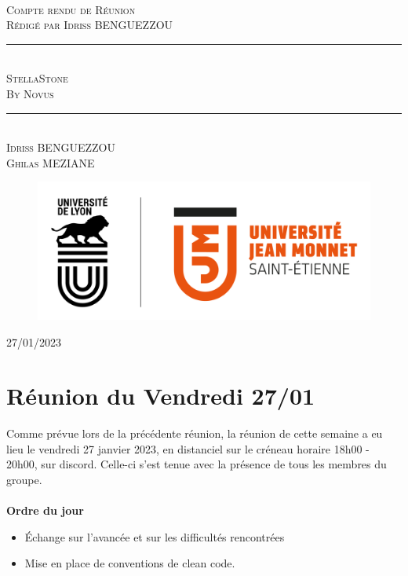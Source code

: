 \documentclass[a4paper, 12pt]{article}
\newcommand{\HRule}{\rule{\linewidth}{0.5mm}}
\begin{document}
\begin{titlepage}
  \begin{sffamily}
  \begin{center}

   
    \textsc{\LARGE }\\[2cm]

    \textsc{\Large Compte rendu de Réunion}\\[1.5cm]
    \textsc{\Medium Rédigé par Idriss BENGUEZZOU}

    \HRule \\[0.4cm]
    { \huge  \textsc{StellaStone} \\
    \textsc{\Large By Novus}\\ [0.4cm] }
	
    \HRule \\[2cm]
    \textsc {Idriss BENGUEZZOU\\Ghilas MEZIANE}
 \begin{figure}
     \centering
    \includegraphics[scale=0.2]{logoUJM.png}
     \label{fig:ujm_logo}
 \end{figure}

    \vfill

    {\large {} 27/01/2023}

  \end{center}
  \end{sffamily}
\end{titlepage}


\newpage

\section{Réunion du Vendredi 27/01}

Comme prévue lors de la précédente réunion, la réunion de cette semaine a eu lieu le vendredi 27 janvier 2023, en distanciel sur le créneau horaire 18h00 - 20h00, sur discord. Celle-ci s’est tenue avec la présence de tous les membres du groupe.
\\\\
\textbf{Ordre du jour}
\begin{itemize}
    \item Échange sur l'avancée et sur les difficultés rencontrées
    \item Mise en place de conventions de clean code.
\end{itemize}
\end{document}
